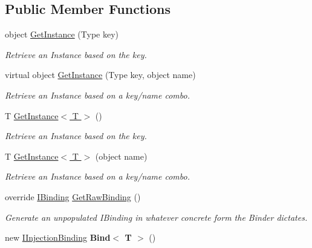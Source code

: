 \subsection*{Public Member Functions}
\begin{DoxyCompactItemize}
\item 
object \hyperlink{classstrange_1_1extensions_1_1injector_1_1impl_1_1_injection_binder_a30a3ddff299d4a86a26e3fd58b4ca68e}{Get\-Instance} (Type key)
\begin{DoxyCompactList}\small\item\em Retrieve an Instance based on the key. \end{DoxyCompactList}\item 
virtual object \hyperlink{classstrange_1_1extensions_1_1injector_1_1impl_1_1_injection_binder_af695f0c65ded51228d02afc0374bacd5}{Get\-Instance} (Type key, object name)
\begin{DoxyCompactList}\small\item\em Retrieve an Instance based on a key/name combo. \end{DoxyCompactList}\item 
T \hyperlink{classstrange_1_1extensions_1_1injector_1_1impl_1_1_injection_binder_a6935985cf687fc03af25385781caf01e}{Get\-Instance$<$ T $>$} ()
\begin{DoxyCompactList}\small\item\em Retrieve an Instance based on the key. \end{DoxyCompactList}\item 
T \hyperlink{classstrange_1_1extensions_1_1injector_1_1impl_1_1_injection_binder_a39f1604a085f9d386adff244a7ad4e69}{Get\-Instance$<$ T $>$} (object name)
\begin{DoxyCompactList}\small\item\em Retrieve an Instance based on a key/name combo. \end{DoxyCompactList}\item 
\hypertarget{classstrange_1_1extensions_1_1injector_1_1impl_1_1_injection_binder_a06ef3bfc85a8c3cb79a115a7b9247c3e}{override \hyperlink{interfacestrange_1_1framework_1_1api_1_1_i_binding}{I\-Binding} \hyperlink{classstrange_1_1extensions_1_1injector_1_1impl_1_1_injection_binder_a06ef3bfc85a8c3cb79a115a7b9247c3e}{Get\-Raw\-Binding} ()}\label{classstrange_1_1extensions_1_1injector_1_1impl_1_1_injection_binder_a06ef3bfc85a8c3cb79a115a7b9247c3e}

\begin{DoxyCompactList}\small\item\em Generate an unpopulated I\-Binding in whatever concrete form the Binder dictates. \end{DoxyCompactList}\item 
\hypertarget{classstrange_1_1extensions_1_1injector_1_1impl_1_1_injection_binder_a225ef5012c33e46aab59ee7f680a7fc5}{new \hyperlink{interfacestrange_1_1extensions_1_1injector_1_1api_1_1_i_injection_binding}{I\-Injection\-Binding} {\bfseries Bind$<$ T $>$} ()}\label{classstrange_1_1extensions_1_1injector_1_1impl_1_1_injection_binder_a225ef5012c33e46aab59ee7f680a7fc5}


\end{DoxyCompactItemize}
